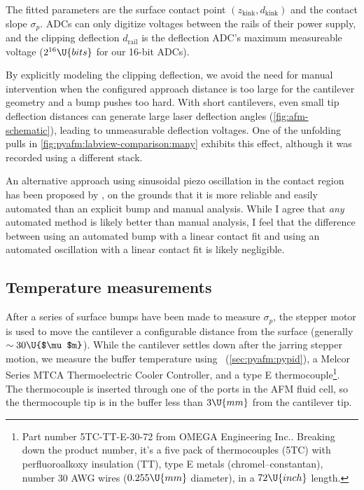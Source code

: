 The fitted parameters are the surface contact point $(z_\text{kink},
d_\text{kink})$ and the contact slope $\sigma_p$.  ADCs can only
digitize voltages between the rails of their power supply, and the
clipping deflection $d_\text{rail}$ is the deflection ADC's maximum
measureable voltage ($2^{16}\U{bits}$ for our 16-bit ADCs).

By explicitly modeling the clipping deflection, we avoid the need for
manual intervention when the configured approach distance is too large
for the cantilever geometry and a bump pushes too hard.  With short
cantilevers, even small tip deflection distances can generate large
laser deflection angles (\cref{fig:afm-schematic}), leading to
unmeasurable deflection voltages.  One of the unfolding pulls in
\cref{fig:pyafm:labview-comparison:many} exhibits this effect,
although it was recorded using a different stack.

An alternative approach using sinusoidal piezo oscillation in the
contact region has been proposed by \citet{materassi09}, on the
grounds that it is more reliable and easily automated than an explicit
bump and manual analysis.  While I agree that \emph{any} automated
method is likely better than manual analysis, I feel that the
difference between using an automated bump with a linear contact fit
and using an automated oscillation with a linear contact fit is likely
negligible.

\subsection{Temperature measurements}
\label{sec:calibcant:temperature}

After a series of surface bumps have been made to measure $\sigma_p$,
the stepper motor is used to move the cantilever a configurable
distance from the surface (generally $\sim30\U{$\mu$m}$).  While the
cantilever settles down after the jarring stepper motion, we measure
the buffer temperature using \pypid\ (\cref{sec:pyafm:pypid}), a
Melcor Series MTCA Thermoelectric Cooler Controller\citep{melcor}, and
a type E thermocouple\footnote{Part number 5TC-TT-E-30-72 from OMEGA
  Engineering Inc.\citep{omega}.  Breaking down the product number,
  it's a five pack of thermocouples (5TC) with perfluoroalkoxy
  insulation (TT), type E metals (chromel--constantan), number 30 AWG
  wires ($0.255\U{mm}$ diameter), in a $72\U{inch}$ length.}.  The
thermocouple is inserted through one of the ports in the AFM fluid
cell, so the thermocouple tip is in the buffer less than $3\U{mm}$
from the cantilever tip.%

